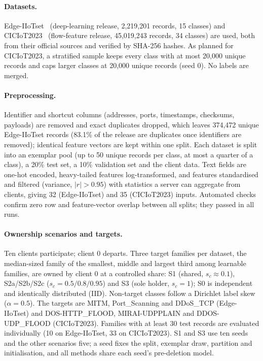 \documentclass[pdflatex,sn-mathphys-num,iicol]{sn-jnl}
\begin{document}
\paragraph{Datasets.} Edge-IIoTset~\cite{ferrag2022} (deep-learning release, 2{,}219{,}201 records, 15 classes) and CICIoT2023~\cite{neto2023} (flow-feature release, 45{,}019{,}243 records, 34 classes) are used, both from their official sources and verified by SHA-256 hashes. As planned for CICIoT2023, a stratified sample keeps every class with at most 20{,}000 unique records and caps larger classes at 20{,}000 unique records (seed 0). No labels are merged.

\paragraph{Preprocessing.} Identifier and shortcut columns (addresses, ports, timestamps, checksums, payloads) are removed and exact duplicates dropped, which leaves 374{,}472 unique Edge-IIoTset records (83.1\% of the release are duplicates once identifiers are removed); identical feature vectors are kept within one split. Each dataset is split into an exemplar pool (up to 50 unique records per class, at most a quarter of a class), a 20\% test set, a 10\% validation set and the client data. Text fields are one-hot encoded, heavy-tailed features log-transformed, and features standardised and filtered (variance, $|r|>0.95$) with statistics a server can aggregate from clients, giving 32 (Edge-IIoTset) and 35 (CICIoT2023) inputs. Automated checks confirm zero row and feature-vector overlap between all splits; they passed in all runs.

\paragraph{Ownership scenarios and targets.} Ten clients participate; client 0 departs. Three target families per dataset, the median-sized family of the smallest, middle and largest third among learnable families, are owned by client 0 at a controlled share: S1 (shared, $s_c\approx0.1$), S2a/S2b/S2c ($s_c=0.5/0.8/0.95$) and S3 (sole holder, $s_c=1$); S0 is independent and identically distributed (IID). Non-target classes follow a Dirichlet label skew ($\alpha=0.5$). The targets are MITM, Port\_Scanning and DDoS\_TCP (Edge-IIoTset) and DOS-HTTP\_FLOOD, MIRAI-UDPPLAIN and DDOS-UDP\_FLOOD (CICIoT2023). Families with at least 30 test records are evaluated individually (10 on Edge-IIoTset, 33 on CICIoT2023). S1 and S3 use ten seeds and the other scenarios five; a seed fixes the split, exemplar draw, partition and initialisation, and all methods share each seed's pre-deletion model.
\end{document}
